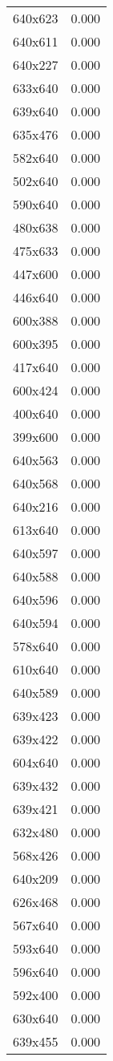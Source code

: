 \begin{table}
\begin{tabular}{lr}
640x623 & 0.000 \\
640x611 & 0.000 \\
640x227 & 0.000 \\
633x640 & 0.000 \\
639x640 & 0.000 \\
635x476 & 0.000 \\
582x640 & 0.000 \\
502x640 & 0.000 \\
590x640 & 0.000 \\
480x638 & 0.000 \\
475x633 & 0.000 \\
447x600 & 0.000 \\
446x640 & 0.000 \\
600x388 & 0.000 \\
600x395 & 0.000 \\
417x640 & 0.000 \\
600x424 & 0.000 \\
400x640 & 0.000 \\
399x600 & 0.000 \\
640x563 & 0.000 \\
640x568 & 0.000 \\
640x216 & 0.000 \\
613x640 & 0.000 \\
640x597 & 0.000 \\
640x588 & 0.000 \\
640x596 & 0.000 \\
640x594 & 0.000 \\
578x640 & 0.000 \\
610x640 & 0.000 \\
640x589 & 0.000 \\
639x423 & 0.000 \\
639x422 & 0.000 \\
604x640 & 0.000 \\
639x432 & 0.000 \\
639x421 & 0.000 \\
632x480 & 0.000 \\
568x426 & 0.000 \\
640x209 & 0.000 \\
626x468 & 0.000 \\
567x640 & 0.000 \\
593x640 & 0.000 \\
596x640 & 0.000 \\
592x400 & 0.000 \\
630x640 & 0.000 \\
639x455 & 0.000 \\

\end{tabular}
\end{table}
